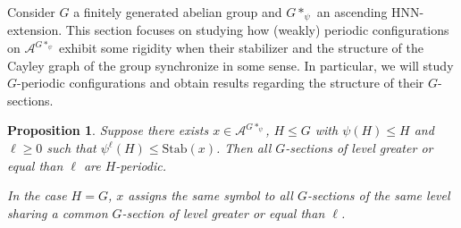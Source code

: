 \documentclass[cupthm,crop,info]{CUP-JNL-ETS}%
\theoremstyle{cupplain}
\newtheorem{proposition}[theorem]{Proposition}
\theoremstyle{cupdefinition}
\theoremstyle{cupremark}
\theoremstyle{cupproof}
\numberwithin{equation}{section}
\providecommand{\DIFadd}[1]{{\protect\color{blue}\uwave{#1}}} %
\providecommand{\DIFaddbegin}{} %
\providecommand{\DIFaddend}{} %
\newcommand{\DIFaddincludegraphics}[2][]{{\color{blue}\fbox{\DIFOincludegraphics[#1]{#2}}}} %
\DeclareRobustCommand{\DIFaddbegin}{\DIFOaddbegin \let\includegraphics\DIFaddincludegraphics} %
\DeclareRobustCommand{\DIFaddend}{\DIFOaddend \let\includegraphics\DIFOincludegraphics} %
\begin{document}
Consider $G$ a finitely generated abelian group and $G*_{\psi}$ an ascending HNN-extension. This section focuses on studying how (weakly) periodic configurations on $\mathcal{A}^{G*_{\psi}}$ exhibit some rigidity when their stabilizer and the structure of the Cayley graph of the group synchronize in some sense. In particular, we will study $G$-periodic configurations and obtain results regarding the structure of their $G$-sections.
\begin{proposition}\label{prop:ascending HNN extension periodicity}
	Suppose there exists $x\in \mathcal{A}^{G*_{\psi}}$, $H\leqslant G$ with $\psi(H)\leqslant H$ and $\ell \ge 0$ such that $\psi^{\ell}(H)\leqslant \mathrm{Stab}(x)$. Then all $G$-sections of \DIFaddbegin \DIFadd{$x$ of }\DIFaddend level greater or equal than $\ell$ are $H$-periodic.

	In the case $H=G$, $x$ assigns the same symbol to all $G$-sections of the same level sharing a common $G$-section of level greater or equal than $\ell$.
\end{proposition}
\end{document}
